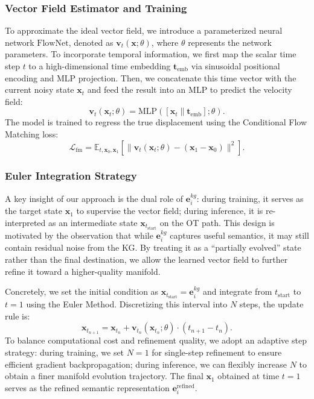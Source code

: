 \subsubsection{\textbf{Vector Field Estimator and Training}}
To approximate the ideal vector field, we introduce a parameterized neural network $\text{FlowNet}$, denoted as $\mathbf{v}_t(\mathbf{x}; \theta)$, where $\theta$ represents the network parameters. To incorporate temporal information, we first map the scalar time step $t$ to a high-dimensional time embedding $\mathbf{t}_{\text{emb}}$ via sinusoidal positional encoding and MLP projection. Then, we concatenate this time vector with the current noisy state $\mathbf{x}_t$ and feed the result into an MLP to predict the velocity field:
\begin{equation}
	\mathbf{v}_t(\mathbf{x}_t; \theta) = \text{MLP}([\mathbf{x}_t \| \mathbf{t}_{\text{emb}}]; \theta).
\end{equation}
The model is trained to regress the true displacement using the Conditional Flow Matching loss:
\begin{equation}
	\mathcal{L}_{\text{fm}} = \mathbb{E}_{t, \mathbf{x}_0, \mathbf{x}_1} \left[ \| \mathbf{v}_t(\mathbf{x}_t; \theta) - (\mathbf{x}_1 - \mathbf{x}_0) \|^2 \right].
\end{equation}

\subsubsection{\textbf{Euler Integration Strategy}}
A key insight of our approach is the dual role of $\mathbf{e}_i^{kg}$: during training, it serves as the target state $\mathbf{x}_1$ to supervise the vector field; during inference, it is re-interpreted as an intermediate state $\mathbf{x}_{t_{\text{start}}}$ on the OT path. This design is motivated by the observation that while $\mathbf{e}_i^{kg}$ captures useful semantics, it may still contain residual noise from the KG. By treating it as a ``partially evolved'' state rather than the final destination, we allow the learned vector field to further refine it toward a higher-quality manifold.

Concretely, we set the initial condition as $\mathbf{x}_{t_{\text{start}}} = \mathbf{e}_i^{kg}$ and integrate from $t_{\text{start}}$ to $t=1$ using the Euler Method. Discretizing this interval into $N$ steps, the update rule is:
\begin{equation}
	\mathbf{x}_{t_{n+1}} = \mathbf{x}_{t_n} + \mathbf{v}_{t_n}(\mathbf{x}_{t_n}; \theta) \cdot (t_{n+1} - t_n).
\end{equation}
To balance computational cost and refinement quality, we adopt an adaptive step strategy: during training, we set $N=1$ for single-step refinement to ensure efficient gradient backpropagation; during inference, we can flexibly increase $N$ to obtain a finer manifold evolution trajectory. The final $\mathbf{x}_1$ obtained at time $t=1$ serves as the refined semantic representation $\mathbf{e}_i^{\text{refined}}$.

